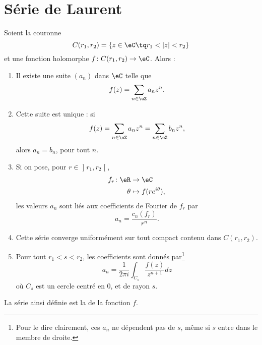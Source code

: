 \section{Série de Laurent}

\begin{theorem}       \label{THOooMKJOooVghZyG}
	Soient la couronne
	\begin{equation}
		C(r_1,r_2)=\{ z\in \eC\tq r_1<| z |<r_2 \}
	\end{equation}
	et une fonction holomorphe \( f\colon C(r_1,r_2)\to \eC\). Alors :
	\begin{enumerate}
		\item
		      Il existe une suite \( (a_n) \) dans \( \eC\) telle que
		      \begin{equation}
			      f(z)=\sum_{n\in \eZ}a_nz^n.
		      \end{equation}
		\item       \label{ITEMooUOPHooSJRGKs}
		      Cette suite est unique : si
		      \begin{equation}
			      f(z)=\sum_{n\in \eZ}a_nz^n=\sum_{n\in \eZ}b_nz^n,
		      \end{equation}
		      alors \( a_n=b_n\), pour tout \( n\).
		\item       \label{ITEMooDGGZooJkDSxC}
		      Si on pose, pour \( r\in \mathopen] r_1 , r_2 \mathclose[\),
		      \begin{equation}
			      \begin{aligned}
				      f_r\colon \eR & \to \eC                   \\
				      \theta        & \mapsto f(r e^{i\theta}),
			      \end{aligned}
		      \end{equation}
		      les valeurs \( a_n\) sont liés aux coefficients de Fourier de \( f_r\) par
		      \begin{equation}
			      a_n=\frac{ c_n(f_r) }{ r^n }.
		      \end{equation}
		\item       \label{ITEMooOYCPooZZAyKs}
		      Cette série converge uniformément sur tout compact contenu dans \( C(r_1,r_2)\).
		\item
		      Pour tout \( r_1<s<r_2\), les coefficients sont donnés par\footnote{Pour le dire clairement, ces \( a_n\) ne dépendent pas de \( s\), même si \( s\) entre dans le membre de droite.}
		      \begin{equation}
			      a_n=\frac{1}{ 2\pi i }\int_{C_s}\frac{ f(z) }{ z^{n+1} }dz
		      \end{equation}
		      où \( C_s\) est un cercle centré en \( 0\), et de rayon \( s\).
	\end{enumerate}
	La série ainsi définie est la  de la fonction \( f\).
\end{theorem}

